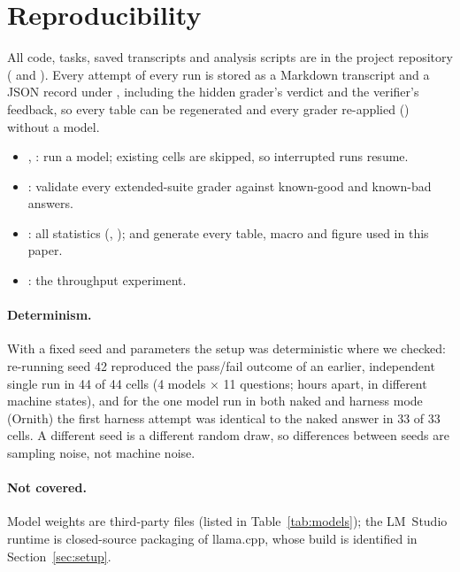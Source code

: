 \section{Reproducibility}
\label{sec:repro}
All code, tasks, saved transcripts and analysis scripts are in the project repository ( and ). Every attempt of every run is stored as a Markdown transcript and a JSON record under ,
including the hidden grader's verdict and the verifier's feedback, so every table can be regenerated and every grader re-applied () without a model.
\begin{itemize}
\item {}, : run a model; existing cells are skipped, so interrupted runs resume.
\item {}: validate every extended-suite grader against known-good and known-bad answers.
\item {}: all statistics (, );  and  generate every table, macro and figure used in this paper.
\item {}: the throughput experiment.
\end{itemize}
\paragraph{Determinism.} With a fixed seed and parameters the setup was deterministic where we checked: re-running seed 42 reproduced the pass/fail outcome of an earlier, independent single run in 44 of 44 cells (4 models $\times$ 11 questions; hours apart, in different machine states), and for the one model run in both naked and harness mode (Ornith) the first harness attempt was identical to the naked answer in 33 of 33 cells.
A different seed is a different random draw, so differences between seeds are sampling noise, not machine noise.
\paragraph{Not covered.} Model weights are third-party files (listed in Table~\ref{tab:models}); the LM~Studio runtime is closed-source packaging of llama.cpp, whose build is identified in Section~\ref{sec:setup}.
